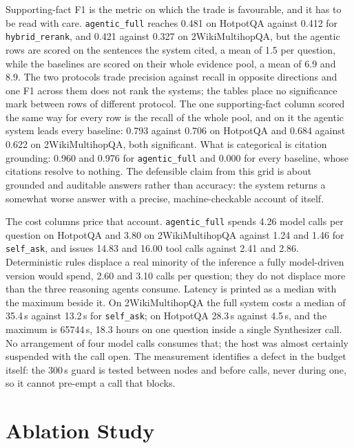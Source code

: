 Supporting-fact F1 is the metric on which the trade is favourable, and it has
to be read with care. \texttt{agentic\_full} reaches 0.481 on HotpotQA against
0.412 for \texttt{hybrid\_rerank}, and 0.421 against 0.327 on 2WikiMultihopQA,
but the agentic rows are scored on the sentences the system cited, a mean of
1.5 per question, while the baselines are scored on their whole evidence pool,
a mean of 6.9 and 8.9. The two protocols trade precision against recall in
opposite directions and one F1 across them does not rank the systems; the
tables place no significance mark between rows of different protocol. The one
supporting-fact column scored the same way for every row is the recall of the
whole pool, and on it the agentic system leads every baseline: 0.793 against
0.706 on HotpotQA and 0.684 against 0.622 on 2WikiMultihopQA, both
significant. What is categorical is citation grounding: 0.960 and 0.976 for
\texttt{agentic\_full} and 0.000 for every baseline, whose citations resolve
to nothing. The defensible claim from this grid is about grounded and
auditable answers rather than accuracy: the system returns a somewhat worse
answer with a precise, machine-checkable account of itself.

The cost columns price that account. \texttt{agentic\_full} spends 4.26 model
calls per question on HotpotQA and 3.80 on 2WikiMultihopQA against 1.24 and
1.46 for \texttt{self\_ask}, and issues 14.83 and 16.00 tool calls against
2.41 and 2.86. Deterministic rules displace a real minority of the inference a
fully model-driven version would spend, 2.60 and 3.10 calls per question; they
do not displace more than the three reasoning agents consume. Latency is
printed as a median with the maximum beside it. On 2WikiMultihopQA the full
system costs a median of 35.4\,s against 13.2\,s for \texttt{self\_ask}; on
HotpotQA 28.3\,s against 4.5\,s, and the maximum is 65744\,s, 18.3 hours on one
question inside a single Synthesizer call. No arrangement of four model calls
consumes that; the host was almost certainly suspended with the call open. The
measurement identifies a defect in the budget itself: the 300\,s guard is
tested between nodes and before calls, never during one, so it cannot pre-empt
a call that blocks.

\section{Ablation Study}
\label{sec:ablations}



